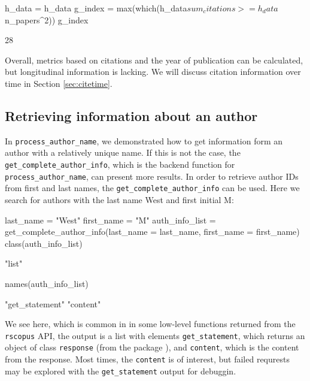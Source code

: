 \begin{Schunk}
\begin{Sinput}
h_data = h_data %>% mutate(sum_citations = cumsum(citations))
g_index = max(which(h_data$sum_citations >= h_data$n_papers^2))
g_index
\end{Sinput}
\begin{Soutput}
[1] 28
\end{Soutput}
\end{Schunk}

Overall, metrics based on citations and the year of publication can be
calculated, but longitudinal information is lacking. We will discuss
citation information over time in Section \ref{sec:citetime}.

\hypertarget{retrieving-information-about-an-author}{%
\subsection{Retrieving information about an
author}\label{retrieving-information-about-an-author}}

In \texttt{process\_author\_name}, we demonstrated how to get
information form an author with a relatively unique name. If this is not
the case, the \texttt{get\_complete\_author\_info}, which is the backend
function for \texttt{process\_author\_name}, can present more results.
In order to retrieve author IDs from first and last names, the
\texttt{get\_complete\_author\_info} can be used. Here we search for
authors with the last name West and first initial M:

\begin{Schunk}
\begin{Sinput}
last_name = "West"
first_name = "M"
auth_info_list = get_complete_author_info(last_name = last_name, first_name = first_name)
class(auth_info_list)
\end{Sinput}
\begin{Soutput}
[1] "list"
\end{Soutput}
\begin{Sinput}
names(auth_info_list)
\end{Sinput}
\begin{Soutput}
[1] "get_statement" "content"      
\end{Soutput}
\end{Schunk}

We see here, which is common in in some low-level functions returned
from the \texttt{rscopus} API, the output is a list with elements
\texttt{get\_statement}, which returns an object of class
\texttt{response} (from the  package \citep{httr}), and
\texttt{content}, which is the content from the response. Most times,
the \texttt{content} is of interest, but failed requrests may be
explored with the \texttt{get\_statement} output for debuggin.

